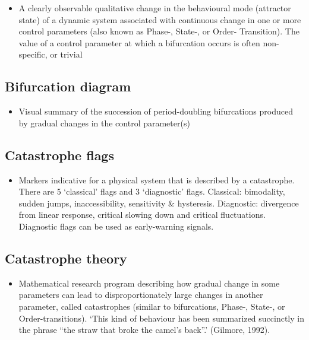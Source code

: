 \documentclass[12pt,]{book}
\providecommand{\tightlist}{%
  \setlength{\itemsep}{0pt}\setlength{\parskip}{0pt}}
\begin{document}
\begin{itemize}
\tightlist
\item
  A clearly observable qualitative change in the behavioural mode (attractor state) of a dynamic system associated with continuous change in one or more control parameters (also known as Phase-, State-, or Order- Transition). The value of a control parameter at which a bifurcation occurs is often non-specific, or trivial
\end{itemize}

\hypertarget{Bifu7}{%
\subsection*{\texorpdfstring{\textbf{Bifurcation diagram}}{Bifurcation diagram}}\label{Bifu7}}

\begin{itemize}
\tightlist
\item
  Visual summary of the succession of period-doubling bifurcations produced by gradual changes in the control parameter(s)
\end{itemize}

\hypertarget{Cata8}{%
\subsection*{\texorpdfstring{\textbf{Catastrophe flags}}{Catastrophe flags}}\label{Cata8}}

\begin{itemize}
\tightlist
\item
  Markers indicative for a physical system that is described by a catastrophe. There are 5 `classical' flags and 3 `diagnostic' flags. Classical: bimodality, sudden jumps, inaccessibility, sensitivity \& hysteresis. Diagnostic: divergence from linear response, critical slowing down and critical fluctuations. Diagnostic flags can be used as early-warning signals.
\end{itemize}

\hypertarget{Cata9}{%
\subsection*{\texorpdfstring{\textbf{Catastrophe theory}}{Catastrophe theory}}\label{Cata9}}

\begin{itemize}
\tightlist
\item
  Mathematical research program describing how gradual change in some parameters can lead to disproportionately large changes in another parameter, called catastrophes (similar to bifurcations, Phase-, State-, or Order-transitions). `This kind of behaviour has been summarized succinctly in the phrase ``the straw that broke the camel's back''.' (Gilmore, 1992).
\end{itemize}
\end{document}
